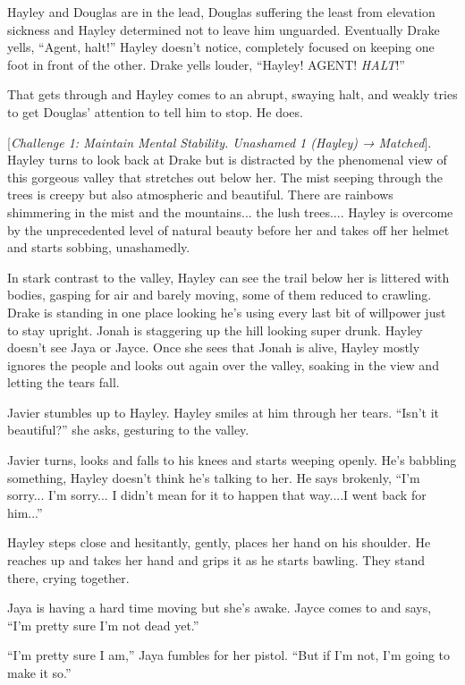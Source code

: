 Hayley and Douglas are in the lead, Douglas suffering the least from elevation sickness and Hayley determined not to leave him unguarded.  Eventually Drake yells, ``Agent, halt!''  Hayley doesn't notice, completely focused on keeping one foot in front of the other.  Drake yells louder, ``Hayley!  AGENT!  \textit{HALT}!''

That gets through and Hayley comes to an abrupt, swaying halt, and weakly tries to get Douglas' attention to tell him to stop.  He does.



{[}\textit{Challenge 1: Maintain Mental Stability.  Unashamed 1 (Hayley) → Matched}{]}.  Hayley turns to look back at Drake but is distracted by the phenomenal view of this gorgeous valley that stretches out below her.  The mist seeping through the trees is creepy but also atmospheric and beautiful.  There are rainbows shimmering in the mist and the mountains... the lush trees....  Hayley is overcome by the unprecedented level of natural beauty before her and takes off her helmet and starts sobbing, unashamedly.

In stark contrast to the valley, Hayley can see the trail below her is littered with bodies, gasping for air and barely moving, some of them reduced to crawling.  Drake is standing in one place looking he's using every last bit of willpower just to stay upright.  Jonah is staggering up the hill looking super drunk.  Hayley doesn't see Jaya or Jayce.  Once she sees that Jonah is alive, Hayley mostly ignores the people and looks out again over the valley, soaking in the view and letting the tears fall. 

Javier stumbles up to Hayley.  Hayley smiles at him through her tears.  ``Isn't it beautiful?'' she asks, gesturing to the valley.  

Javier turns, looks and falls to his knees and starts weeping openly.  He's babbling something, Hayley doesn't think he's talking to her.  He says brokenly, ``I'm sorry... I'm sorry... I didn't mean for it to happen that way....I went back for him...''  

Hayley steps close and hesitantly, gently, places her hand on his shoulder.  He reaches up and takes her hand and grips it as he starts bawling.  They stand there, crying together.



Jaya is having a hard time moving but she's awake.  Jayce comes to and says, ``I'm pretty sure I'm not dead yet.''

``I'm pretty sure I am,'' Jaya fumbles for her pistol. ``But if I'm not, I'm going to make it so.''

